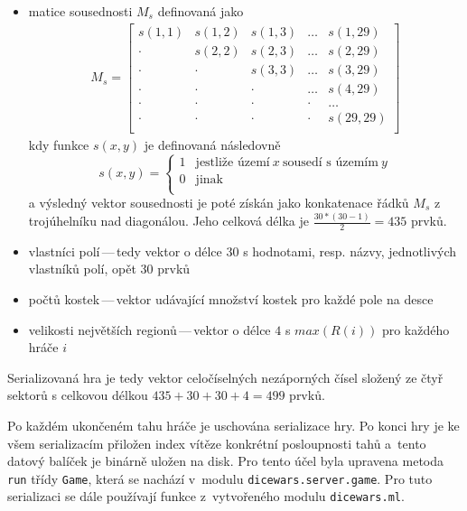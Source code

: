 \documentclass[11pt, a4paper]{article}
\theoremstyle{definition}
\begin{document}
\begin{itemize}
    \item matice sousednosti $M_s$ definovaná jako
    \begin{align*}
        M_s =
        \begin{bmatrix}
            s(1, 1) & s(1, 2) & s(1, 3) & \ldots & s(1, 29) \\
            \cdot   & s(2, 2) & s(2, 3) & \ldots & s(2, 29) \\
            \cdot   & \cdot   & s(3, 3) & \ldots & s(3, 29) \\
            \cdot   & \cdot   & \cdot   & \ldots & s(4, 29) \\
            \cdot   & \cdot   & \cdot   & \cdot  & \ldots   \\
            \cdot   & \cdot   & \cdot   & \cdot  & s(29, 29)\\
        \end{bmatrix}
    \end{align*}
    kdy funkce $s(x, y)$ je definovaná následovně
    \begin{equation*}
        s(x, y) =
        \begin{cases}
            1 & \text{jestliže území}\ x\ \text{sousedí s územím}\ y\\
            0 & \text{jinak}\\
        \end{cases}
    \end{equation*}
    a výsledný vektor sousednosti je poté získán jako konkatenace řádků $M_s$ z trojúhelníku nad diagonálou. Jeho celková délka je $\frac{30 * (30 - 1)}{2} = 435$ prvků.
    \item vlastníci polí\,---\,tedy vektor o délce $30$ s hodnotami, resp. názvy, jednotlivých vlastníků polí, opět $30$ prvků
    \item počtů kostek\,---\,vektor udávající množství kostek pro každé pole na desce
    \item velikosti největších regionů\,---\,vektor o délce $4$ s $max(R(i))$ pro každého hráče $i$
\end{itemize}

Serializovaná hra je tedy vektor celočíselných nezáporných čísel složený ze čtyř sektorů s celkovou délkou $435 + 30 + 30 + 4 = 499$ prvků.

Po každém ukončeném tahu hráče je uschována serializace hry.
Po konci hry je ke všem serializacím přiložen index vítěze konkrétní posloupnosti tahů a~tento datový balíček
je binárně uložen na disk. Pro tento účel byla upravena metoda \texttt{run} třídy \texttt{Game}, která se nachází v~modulu
\texttt{dicewars.server.game}. Pro tuto serializaci se dále používají funkce z~vytvořeného modulu
\texttt{dicewars.ml}.
\end{document}
